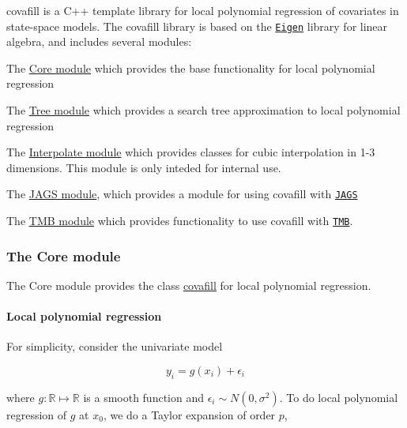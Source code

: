 covafill is a C++ template library for local polynomial regression of covariates in state-\/space models. The covafill library is based on the \href{http://http://eigen.tuxfamily.org}{\tt Eigen} library for linear algebra, and includes several modules\+:


\begin{DoxyItemize}
\item The \hyperlink{group__core}{Core module} which provides the base functionality for local polynomial regression
\item The \hyperlink{group__tree}{Tree module} which provides a search tree approximation to local polynomial regression
\item The \hyperlink{group__interpolate}{Interpolate module} which provides classes for cubic interpolation in 1-\/3 dimensions. This module is only inteded for internal use.
\item The \hyperlink{group__jags}{J\+A\+G\+S module}, which provides a module for using covafill with \href{http://mcmc-jags.sourceforge.net/}{\tt J\+A\+G\+S}
\item The \hyperlink{group__tmb}{T\+M\+B module} which provides functionality to use covafill with \href{http://tmb-project.org}{\tt T\+M\+B}.
\end{DoxyItemize}

\subsubsection*{The Core module}

The Core module provides the class \hyperlink{classcovafill}{covafill} for local polynomial regression.

\paragraph*{Local polynomial regression}

For simplicity, consider the univariate model

\[ y_i = g(x_i) + \epsilon_i \]

where $g:\mathbb{R}\mapsto\mathbb{R}$ is a smooth function and $ \epsilon_i\sim N(0,\sigma^2)$. To do local polynomial regression of $g$ at $x_0$, we do a Taylor expansion of order $p$,

